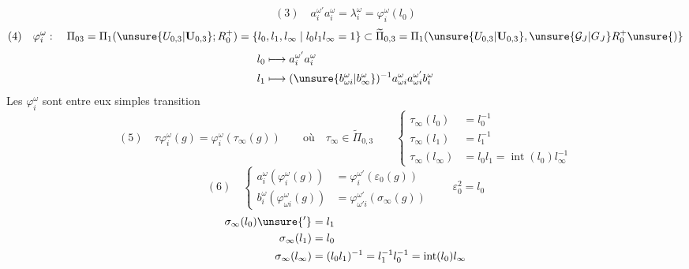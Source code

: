 \[
(3)\quad a_i^{\omega'}a_i^\omega=\lambda_i^\omega=\varphi_i^\omega(l_0)
\]
\[
(4)\quad \varphi_i^\omega:\quad
\Pi_{03}=\Pi_1(\unsure{U_{0,3}|\mathbf U_{0,3}};R_0^+)=\{l_0,l_1,l_\infty\mid l_0l_1l_\infty=1\}
\subset\widetilde\Pi_{0,3}=\Pi_1(\unsure{U_{0,3}|\mathbf U_{0,3}},\unsure{\mathcal G_J|G_J} R_0^+\unsure{)}
\]
\[
\begin{aligned}
l_0&\longmapsto a_i^{\omega'}a_i^\omega\\
l_1&\longmapsto (\unsure{b_{\omega i}^\omega|b_\infty^\omega})^{-1}a_{\omega i}^{\omega}a_{\omega i}^{\omega'}b_i^\omega
\end{aligned}
\]
Les $\varphi_i^\omega$ sont  entre eux   simples  transition
\[
(5)\quad\tau\varphi_i^\omega(g)=\varphi_i^\omega(\tau_\infty(g))
\qquad\text{où}\quad\tau_\infty\in\widetilde\Pi_{0,3}
\qquad\left\{\begin{aligned}
\tau_\infty(l_0)&=l_0^{-1}\\
\tau_\infty(l_1)&=l_1^{-1}\\
\tau_\infty(l_\infty)&=l_0l_1=\operatorname{int}(l_0)l_\infty^{-1}
\end{aligned}\right.
\]
\[
(6)\quad\left\{\begin{aligned}
a_i^\omega(\varphi_i^\omega(g))&=\varphi_i^{\omega'}(\varepsilon_0(g))\\
b_i^\omega(\varphi_{\omega i}^\omega(g))&=\varphi_{\omega'i}^{\omega'}(\sigma_\infty(g))
\end{aligned}\right.
\qquad\varepsilon_0^2=l_0
\]
\[
\begin{aligned}
\sigma_\infty(l_0)\unsure{'}&=l_1\\
\sigma_\infty(l_1)&=l_0\\
\sigma_\infty(l_\infty)&=(l_0l_1)^{-1}=l_1^{-1}l_0^{-1}=\operatorname{int}(l_0)l_\infty
\end{aligned}
\]


